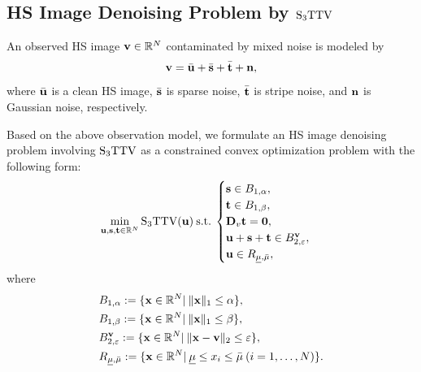 \documentclass[10pt,journal]{IEEEtran}
\begin{document}
\subsection{HS Image Denoising Problem by ${\text{S}_{3} \text{TTV}}$}
\label{subsec:HSI_Denoising_Problem}
An observed HS image $\mathbf{v} \in \mathbb{R}^{N}$ contaminated by mixed noise is modeled by
\begin{equation}
    \label{eq:Obsevation_model}
    \mathbf{v} = \bar{\mathbf{u}} + \bar{\mathbf{s}} + \bar{\mathbf{t}} + \mathbf{n},
\end{equation}
where $\bar{\mathbf{u}}$ is a clean HS image, $\bar{\mathbf{s}}$ is sparse noise, $\bar{\mathbf{t}}$ is stripe noise, and $\mathbf{n}$ is Gaussian noise, respectively.

Based on the above observation model, we formulate an HS image denoising problem involving ${\text{S}_{3} \text{TTV}}$ as a constrained convex optimization problem with the following form:
\begin{equation}
    \label{prob:S3TTV_denoising}
    \min_{\mathbf{u}, \mathbf{s}, \mathbf{t} \in \mathbb{R}^{N}} {\text{S}_{3} \text{TTV}}(\mathbf{u}) \: \mathrm{s.t.} \:
    \begin{cases} 
        \mathbf{s} \in B_{1, \alpha}, \\ 
        \mathbf{t} \in B_{1, \beta}, \\
        \mathbf{D}_{v} \mathbf{t} = \mathbf{0}, \\
        \mathbf{u} + \mathbf{s} + \mathbf{t} \in B_{2, \varepsilon}^{\mathbf{v}}, \\  
        \mathbf{u} \in R_{\underline{\mu},\bar{\mu}},
    \end{cases}
\end{equation}
where
\begin{align}
    \label{eq:constraint_sparse}
    &B_{1, \alpha} := \{ \mathbf{x} \in \mathbb{R}^{N} | \:
    \|\mathbf{x}\|_{1} \leq \alpha \},  \\
    \label{eq:constraint_stripe}
    &B_{1, \beta} := \{ \mathbf{x} \in \mathbb{R}^{N} | \:
    \|\mathbf{x}\|_{1} \leq \beta \},  \\
    \label{eq:constraint_fidel}
    &B_{2, \varepsilon}^{\mathbf{v}} := \{ \mathbf{x} \in \mathbb{R}^{N} | \:
    \|\mathbf{x} - \mathbf{v}\|_2 \leq \varepsilon \},  \\
    \label{eq:constraint_box}
    &R_{\underline{\mu},\bar{\mu}} := \{ \mathbf{x} \in \mathbb{R}^{N} | \:
    \underline{\mu} \leq x_{i} \leq \bar{\mu}  \: (i = 1,\dots , N) \}.
\end{align}
\end{document}
